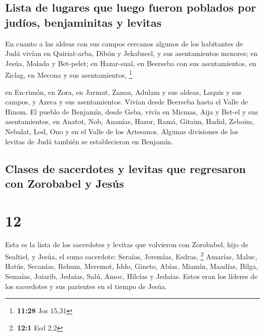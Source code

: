 \hypertarget{lista-de-lugares-que-luego-fueron-poblados-por-juduxedos-benjaminitas-y-levitas}{%
\subsection{Lista de lugares que luego fueron poblados por judíos,
benjaminitas y
levitas}\label{lista-de-lugares-que-luego-fueron-poblados-por-juduxedos-benjaminitas-y-levitas}}

 En cuanto a las aldeas con sus campos cercanos algunos
de los habitantes de Judá vivían en Quiriat-arba, Dibón y Jekabzeel, y
sus asentamientos menores;  en Jesúa, Molada y Bet-pelet;
 en Hazar-sual, en Beerseba con sus asentamientos,
 en Ziclag, en Mecona y sus asentamientos, \footnote{\textbf{11:28}
  Jos 15,31}

 en En-rimón, en Zora, en Jarmut,  Zanoa,
Adulam y sus aldeas, Laquis y sus campos, y Azeca y sus asentamientos.
Vivían desde Beerseba hasta el Valle de Hinom.  El pueblo
de Benjamín, desde Geba, vivía en Micmas, Aija y Bet-el y sus
asentamientos,  en Anatot, Nob, Ananías, 
Hazor, Ramá, Gitaim,  Hadid, Zeboim, Nebalat,
 Lod, Ono y en el Valle de los Artesanos. 
Algunas divisiones de los levitas de Judá también se establecieron en
Benjamín.

\hypertarget{clases-de-sacerdotes-y-levitas-que-regresaron-con-zorobabel-y-jesuxfas}{%
\subsection{Clases de sacerdotes y levitas que regresaron con Zorobabel
y
Jesús}\label{clases-de-sacerdotes-y-levitas-que-regresaron-con-zorobabel-y-jesuxfas}}

\hypertarget{section-11}{%
\section{12}\label{section-11}}

 Esta es la lista de los sacerdotes y levitas que
volvieron con Zorobabel, hijo de Sealtiel, y Jesúa, el sumo sacerdote:
Seraías, Jeremías, Esdras, \footnote{\textbf{12:1} Esd 2,2}
 Amarías, Maluc, Hatús,  Secanías, Rehum,
Meremot,  Iddo, Gineto, Abías,  Miamín,
Maadías, Bilga,  Semaías, Joiarib, Jedaías, 
Salú, Amoc, Hilcías y Jedaías. Estos eran los líderes de los sacerdotes
y sus parientes en el tiempo de Jesúa.

